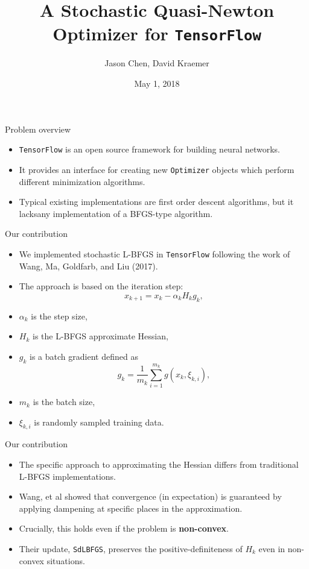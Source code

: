 \documentclass[draft]{beamer}
\title{A Stochastic Quasi-Newton Optimizer for \texttt{TensorFlow}}
\author[Chen, Kraemer]{%
Jason Chen\inst{1}, %
David Kraemer\inst{1}}
\institute[Stony Brook University]
{
  \inst{1}%
  CSE 592: Convex Optimization \\
  Stony Brook University
}
\date[2018]{May 1, 2018}
\begin{document}
\maketitle

\begin{frame}[t]{Problem overview}
  \begin{itemize}
    \item \texttt{TensorFlow} is an open source framework for building neural
      networks.
    \item It provides an interface for creating new \texttt{Optimizer}
      objects which perform different minimization algorithms.
    \item Typical existing implementations are first order descent
      algorithms, but it lacks\footnotemark any implementation of a BFGS-type
      algorithm.
  \end{itemize}
\end{frame}

\begin{frame}[t]{Our contribution}
  \begin{itemize}
    \item We implemented stochastic L-BFGS in \texttt{TensorFlow} following the
      work of Wang, Ma, Goldfarb, and Liu (2017).
    \item The approach is based on the iteration step:
      \[
        x_{k+1} = x_k - \alpha_k H_k g_k,
      \]
    \item $\alpha_k$ is the step size,
    \item $H_k$ is the L-BFGS approximate Hessian,
    \item $g_k$ is a batch gradient defined as
      \begin{equation*}
        g_k = \frac{1}{m_k} \sum_{i=1}^{m_k} g(x_k, \xi_{k,i}),
      \end{equation*}
    \item $m_k$ is the batch size,
    \item $\xi_{k,i}$ is randomly sampled training data.
  \end{itemize}
\end{frame}

\begin{frame}[t]{Our contribution}
  \begin{itemize}
    \item The specific approach to approximating the Hessian differs from
      traditional L-BFGS implementations.
    \item Wang, et al showed that convergence (in expectation) is guaranteed by
      applying dampening at specific places in the approximation.
    \item Crucially, this holds even if the problem is \textbf{non-convex}.
    \item Their update, \texttt{SdLBFGS}, preserves the positive-definiteness of
      $H_k$ even in non-convex situations.
  \end{itemize}
\end{frame}
\end{document}
